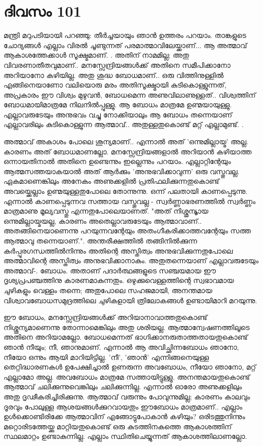 \newpage
\section{ദിവസം 101}


മന്ത്രി മറുപടിയായി പറഞ്ഞു: തീര്‍ച്ചയായും ഞാന്‍ ഉത്തരം പറയാം. താങ്കളുടെ ചോദ്യങ്ങള്‍ എല്ലാം വിരല്‍ ചൂണ്ടുന്നത്‌ പരമാത്മാവിലേയ്ക്കാണ്‌...  ആ അത്മാവ്‌ ആകാശത്തേക്കാള്‍ സൂക്ഷ്മമാണ്‌. . അതിന്‌ നാമമില്ല; അതു വിവരണാതീതവുമാണ്‌.. മനസ്സേന്ദ്രിയങ്ങള്‍ക്ക്‌ അതിനെ സമീപിക്കാനോ അറിയാനോ കഴിയില്ല. അതു ശുദ്ധ ബോധമാണ്‌.. ഒരു വിത്തിനുള്ളില്‍ എങ്ങിനെയാണോ വലിയൊരു മരം അതിസൂക്ഷ്മായി കുടികൊള്ളുന്നത്‌, അപ്രകാരം ഈ വിശ്വം മുഴുവന്‍, ബോധമെന്ന അണുവിലാണുള്ളത്‌.. വിശ്വത്തിന്‌ ബോധമായിമാത്രമേ നിലനില്‍പ്പുള്ളു. ആ ബോധം മാത്രമേ ഉണ്മയായുള്ളു. എല്ലാവരുടേയും അനുഭവം വച്ചു നോക്കിയാലും ആ ബോധം തന്നെയാണ്‌ എല്ലാവരിലും കുടികൊള്ളുന്ന ആത്മാവ്‌.. അതുള്ളതുകൊണ്ട്‌ മറ്റ്‌ എല്ലാമുണ്ട്‌. .

അത്മാവ്‌ അകാശം പോലെ ശൂന്യമാണ്‌.. എന്നാല്‍ അത്‌ 'ഒന്നുമില്ലായ്മ' അല്ല. കാരണം അത്‌ ബോധമാണല്ലോ. മനസ്സേന്ദ്രിയങ്ങളാല്‍ അറിയാന്‍ കഴിയാത്ത ഒന്നായതിനാല്‍ അതിനെ ഉണ്ടെന്നും ഇല്ലെന്നും പറയാം. എല്ലാറ്റിന്റേയും ആത്മസത്തയാകയാല്‍ അത്‌ ആര്‍ക്കും 'അനുഭവിക്കാവുന്ന' ഒരു വസ്തുവല്ല. ഏകമാണെങ്കിലും അനേകം അണുക്കളില്‍ പ്രതിഫലിക്കുന്നതുകൊണ്ട്‌ അവയ്ക്കെല്ലാം ഉണ്മയുള്ളതുപോലെ തോന്നുന്നു. ഒന്ന് പലതായി കാണപ്പെടുന്നു. എന്നാല്‍ കാണപ്പെടുന്നവ സത്തായ വസ്തുവല്ല - സ്വര്‍ണ്ണാഭരണത്തില്‍ സ്വര്‍ണ്ണം മാത്രമാണു മൂല്യവസ്തു എന്നതുപോലെയാണത്‌. "അത്‌ നിശ്ശൂന്യ്മായ ഒന്നുമില്ലായ്മയല്ല, കാരണം അതെല്ലാവരുടേയും ആത്മാവാണ്‌.. അതങ്ങിനെയാണെന്നു പറയുന്നവന്റേയും അതംഗീകരിക്കാത്തവന്റേയും സത്ത ആത്മാവു തന്നെയാണ്‌.". അന്തരീക്ഷത്തില്‍ തങ്ങിനില്‍ക്കുന്ന കര്‍പ്പൂരഗന്ധത്തില്‍നിന്നും അതിന്റെ അസ്തിത്വം അനുഭവിക്കുന്നതുപോലെ അത്മാവിന്റെ അസ്തിത്വം അനുഭവിക്കാനാകും. അതുതന്നെയാണ്‌ എല്ലാവരുടേയും അത്മാവ്‌-. ബോധം. അതാണ്‌ പദാര്‍ത്ഥങ്ങളുടെ സഞ്ചയമായ ഈ ദൃശ്യപ്രപഞ്ചത്തിനു കാരണമാകുന്നതും. ഒഴുക്കുവെള്ളത്തിന്റെ സ്വഭാവമായ ചുഴികളും വെള്ളം തന്നെ; അതുപോലെ സഹജമായി, അനന്തമായ വിശ്വാവബോധസമുദ്രത്തിലെ ചുഴികളായി ത്രിലോകങ്ങള്‍ ഉണ്ടായിമാറി മറയുന്നു. 

ഈ ബോധം, മനസ്സേന്ദ്രിയങ്ങള്‍ക്ക്‌ അറിയാനാവാത്തതുകൊണ്ട്‌ നിശ്ശൂന്യമാണെന്നു തോന്നാമെങ്കിലും അതു ശരിയല്ല. ആത്മാന്വേഷണത്തിലൂടെ അതിനെ അറിയാമല്ലോ. ബോധമെന്നത്‌ ഭാഗിക്കാനരുതാത്തതായതുകൊണ്ട്‌ ഞാന്‍ നീയും; നീ, ഞാനുമാണ്‌. എന്നാല്‍ ആ അവിച്ഛിന്നബോധം ഞാനോ, നീയോ ഒന്നും ആയി മാറിയിട്ടില്ല. 'നീ', 'ഞാന്‍' എന്നിങ്ങനെയുള്ള തെറ്റിദ്ധാരണകള്‍ ഉപേക്ഷിച്ചാല്‍ ഉണരുന്ന അവബോധം, നീയോ ഞാനോ, മറ്റ്‌ എല്ലാമോ അല്ല. അവബോധം മാത്രമേ സത്തായിട്ടുള്ളു. അനന്തമായതുകൊണ്ട്‌ ആത്മാവ്‌ ചലിക്കുന്നുവെങ്കിലും ചലിക്കുന്നില്ല. എന്നാല്‍ ഓരോ അണുക്കളിലും അതു ദൃഢീകരിച്ചിരിക്കുന്നു. ആത്മാവ്‌ വരുന്നും പോവുന്നുമില്ല; കാരണം കാലവും ദൂരവും പോലുള്ള ആശയങ്ങള്‍ക്കുറവായതും ഈബോധം മാത്രമാണ്‌.. എല്ലാം ഉള്‍ക്കൊണ്ടിരിക്കേ ആത്മാവിന്‌ എങ്ങോട്ടുപോകാന്‍ കഴിയും? ഒരിടത്തുനിന്നും മറ്റൊരിടത്തേയ്ക്കു മാറ്റിയതുകൊണ്ട്‌ ഒരു കുടത്തിനകത്തെ ആകാശത്തിന്‌ സ്ഥലമാറ്റം ഉണ്ടാകുന്നില്ല. എല്ലാം സ്ഥിതിചെയ്യുന്നത്‌ ആകാശത്തിലാണല്ലോ. 

